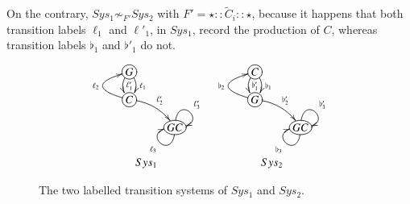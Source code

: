 On the contrary, $Sys_1 \not \sim_{F'} Sys_2$  with $F' =  \star :: \widetilde{C}_i :: \star $, 
because it happens that both  transition labels $\ell_1$  and $\ell'_1$, in $Sys_1$, record the production of $C$, whereas 
transition labels $\flat_1$ and $\flat'_1$ do not.
\begin{figure}
\[
\begin{array}{cc}
\xymatrix@R-1pc{
*+[o][F-]{G} \ar@/ ^/[d]^{\ell_1} \ar@/_/[d]^{\ell'_1} \\
*+[o][F-]{C} \ar@/^2pc/[u]^{\ell_2} \ar@/^/[dr]^{\ell'_2} \\ %
& *+[o][F-]{GC}\ar@(d,l)^{\ell_3}\ar@(u,r)^{\ell'_3}
}
&
\xymatrix@R-1pc{
*+[o][F-]{C} \ar@/ ^/[d]^{\flat_1} \ar@/_/[d]^{\flat'_1} \\
*+[o][F-]{G} \ar@/^2pc/[u]^{\flat_2} \ar@/^/[dr]^{\flat'_2} \\ 
& *+[o][F-]{GC}\ar@(d,l)^{\flat_3}\ar@(u,r)^{\flat'_3}
}\\
Sys_1 & Sys_2
\end{array}
\]
\caption{The two labelled transition systems of $Sys_1$ and $Sys_2$.}\label{fig:ltss}
\end{figure}